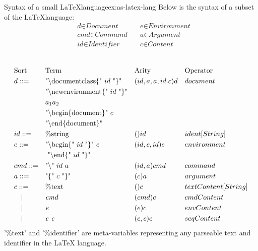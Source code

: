 \begin{example}{Syntax of a small \LaTeX language}{ex:as-latex-lang}
  Below is the syntax of a subset of the \LaTeX language:
  \[
    \begin{aligned}
       & \textit{d} \in \textit{Document}    \quad & \textit{e} \in \textit{Environment} \\
       & \textit{cmd} \in \textit{Command}   \quad & \textit{a} \in \textit{Argument}    \\
       & \textit{id} \in \textit{Identifier} \quad & \textit{c} \in \textit{Content}     \\
    \end{aligned}
  \]
  \\
  \[
    \begin{aligned}
       & \text{Sort} &  & \text{Term}                             &  & \text{Arity}   &  & \text{Operator}     \\
       & d ::=       &  & \text{"\textbackslash documentclass\{" $id$ "\}"}  &  & (id,a,a,id.c)d &  & document            \\
       &             &  & \text{"\textbackslash newenvironment\{" $id$ "\}"} &  &                &  &                     \\
       &             &  & \text{$a_1$} \textit{$a_2$}             &  &                &  &                     \\
       &             &  & \text{"\textbackslash begin\{document\}" $c$}      &  &                &  &                     \\
       &             &  & \text{"\textbackslash end\{document\}"}            &  &                &  &                     \\
       & id ::=      &  & \text{\%string}                         &  & ()id           &  & ident[String]       \\
       & e ::=       &  & \text{"\textbackslash begin\{" $id$ "\}" $c$}      &  & (id,c,id)e     &  & environment         \\
       &             &  & \text{ "\textbackslash end\{" $id$ "\}"}           &  &                &  &                     \\
       & cmd ::=     &  & \text{"\textbackslash" $id$ $a$}                  &  & (id,a)cmd      &  & command             \\
       & a ::=       &  & \text{"\{" $c$ "\}"}                    &  & (c)a           &  & argument            \\
       & c ::=       &  & \text{\%text}                           &  & ()c            &  & textContent[String] \\
       & \quad |     &  & \textit{cmd}                            &  & (cmd)c         &  & cmdContent          \\
       & \quad |     &  & \textit{e}                              &  & (e)c           &  & envContent          \\
       & \quad |     &  & \textit{c } \textit{c}                  &  & (c,c)c         &  & seqContent          \\
    \end{aligned}
  \]
  '\%text' and '\%identifier' are meta-variables representing any parseable text and identifier in the LaTeX language.


\end{example}

